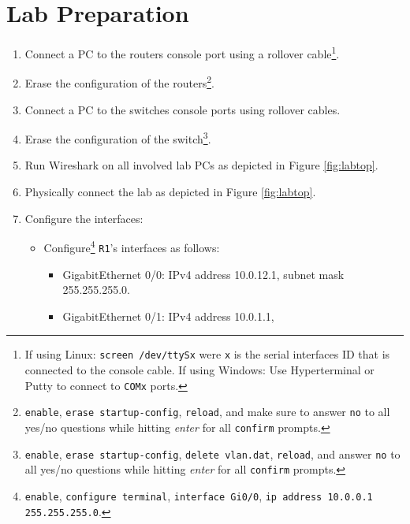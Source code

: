 \documentclass[pdftex,12pt,a4paper]{article}
\begin{document}
    \section{Lab Preparation}
        \begin{enumerate}
            \item Connect a PC to the routers console port using a rollover
                cable\footnote{If using Linux: \texttt{screen /dev/ttySx} were
                \texttt{x} is the
                serial interfaces ID that is connected to the console
                cable. If using Windows: Use Hyperterminal or Putty to
                connect to \texttt{COMx} ports.}.
            \item Erase the configuration of the
                routers\footnote{\texttt{enable}, \texttt{erase
                startup-config}, \texttt{reload}, and make sure to answer
                \texttt{no} to all yes/no questions while hitting
                \emph{enter} for all \texttt{confirm} prompts.}.
            \item Connect a PC to the switches console ports using rollover
                cables.
            \item Erase the configuration of the
                switch\footnote{\texttt{enable}, \texttt{erase startup-config},
                \texttt{delete vlan.dat}, \texttt{reload}, and answer
                \texttt{no} to all yes/no questions while hitting
                \emph{enter} for all \texttt{confirm} prompts.}.
            \item Run Wireshark on all involved lab PCs as depicted in Figure
                \ref{fig:labtop}.
            \item Physically connect the lab as depicted in Figure \ref{fig:labtop}.
            \item Configure the interfaces:
                \begin{itemize}
                    \item Configure\footnote{\texttt{enable}, \texttt{configure
                        terminal}, \texttt{interface Gi0/0}, \texttt{ip address
                        10.0.0.1 255.255.255.0}.} \texttt{R1}'s interfaces as follows:
                        \begin{itemize}
                            \item GigabitEthernet 0/0: IPv4 address 10.0.12.1,
                                subnet mask 255.255.255.0.
                            \item GigabitEthernet 0/1: IPv4 address 10.0.1.1,

\end{itemize}
\end{itemize}
\end{enumerate}
\end{document}
